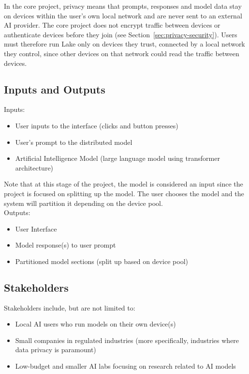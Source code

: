 \documentclass{article}
\begin{document}
In the core project, privacy means that prompts, responses and model data stay on
devices within the user's own local network and are never sent to an external AI
provider. The core project does not encrypt traffic between devices or authenticate
devices before they join (see Section~\ref{sec:privacy-security}). Users
must therefore run Lake only on devices they trust, connected by a local
network they control, since other devices on that network could read the
traffic between devices.

\subsection{Inputs and Outputs}

Inputs:

\begin{itemize}
    \item User inputs to the interface (clicks and button presses)
    \item User's prompt to the distributed model
    \item Artificial Intelligence Model (large language model using transformer architecture)
\end{itemize}

Note that at this stage of the project, the model is considered an input since the project is focused on splitting up the model. The user chooses the model and the system will partition it depending on the device pool. \\[0.5ex]

Outputs:
\begin{itemize}
    \item User Interface 
    \item Model response(s) to user prompt
    \item Partitioned model sections (split up based on device pool)
\end{itemize}

\subsection{Stakeholders}

Stakeholders include, but are not limited to:

\begin{itemize}
    \item Local AI users who run models on their own device(s)
    \item Small companies in regulated industries (more specifically, industries where data privacy is paramount)
    \item Low-budget and smaller AI labs focusing on research related to AI models
\end{itemize}
\end{document}
